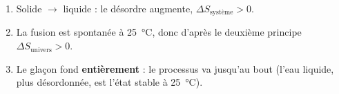 \documentclass[11pt,a4paper]{article}
\newcommand{\dS}{\Delta S}
\newcommand{\rep}[1]{\textcolor{primarydark}{\textbf{#1}}}
\begin{document}
\begin{correction}
\begin{enumerate}[label=\alph*),leftmargin=2em,topsep=2pt,itemsep=2pt]
  \item Solide $\to$ liquide : le désordre augmente, \rep{$\dS_{\text{système}}>0$}.
  \item La fusion est spontanée à \SI{25}{\celsius}, donc d'après le deuxième principe
        \rep{$\dS_{\text{univers}}>0$}.
  \item Le glaçon fond \rep{entièrement} : le processus va jusqu'au bout (l'eau liquide, plus désordonnée,
        est l'état stable à \SI{25}{\celsius}).
\end{enumerate}
\end{correction}
\end{document}
